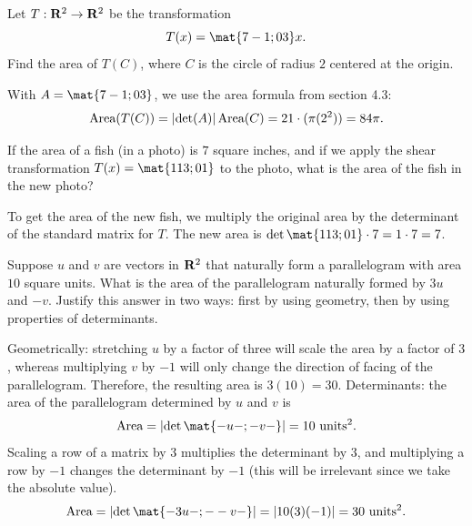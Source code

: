 \begin{problems}
\problem %
Let $T: {\bf R}^2 \to {\bf R}^2$ be the transformation
\[T(x) = \mat{7 -1; 0 3} x.\] Find the area of $T(C)$, where $C$ is the circle
of radius $2$ centered at the origin.

\begin{solution}
With $A = \mat{7 -1; 0 3}$, we use the area formula from section 4.3:
\[\textup{Area}(T(C)) = \left| \det(A) \right| \textup{Area}(C)
  = 21 \cdot (\pi(2^2)) = 84 \pi.\]
\end{solution}


\problem %
  If the area of a fish (in a photo) is $7$ square inches, and if we apply the
  shear transformation $T(x) = \mat{1 13; 0 1}$ to the photo, what is the area
  of the fish in the new photo?

\begin{solution}
  To get the area of the new fish, we multiply the original area by the
  determinant of the standard matrix for $T$.  The new area is
  $\det\mat{1 13; 0 1} \cdot 7 = 1 \cdot 7 = 7$.
\end{solution}


%

\problem %
Suppose $u$ and $v$ are vectors in ${\bf R}^2$ that naturally form a
parallelogram with area $10$ square units.  What is the area of the
parallelogram naturally formed by $3u$ and $-v$. Justify this answer
in two ways: first by using geometry, then by using properties of
determinants.

\begin{solution}
  Geometrically: stretching $u$ by a factor of three will scale the
  area by a factor of $3$, whereas multiplying $v$ by $-1$ will only
  change the direction of facing of the parallelogram.  Therefore, the
  resulting area is $3(10)=30$.
  Determinants: the area of the parallelogram determined by $u$ and
  $v$ is
   \[\textup{Area} = \left|\det \mat{- u -; - v -}\right|=10 \textup{
       units}^2.\] Scaling a row of a matrix by $3$ multiplies the
   determinant by $3$, and multiplying a row by $-1$ changes the
   determinant by $-1$ (this will be irrelevant since we take the
   absolute value).
   \[\textup{Area} = \left|\det \mat{- 3u -; - -v -}\right| =
     |10(3)(-1)| = 30 \textup{ units}^2.\]
\end{solution}

 
 
\end{problems}\setcounter{problem}{0}
\newpage